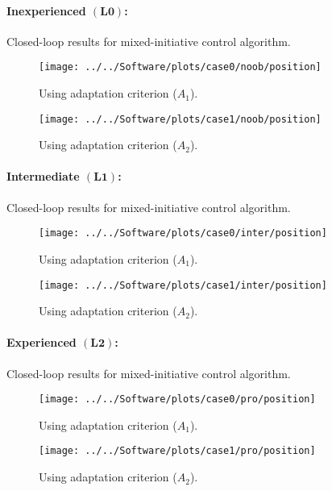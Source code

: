 \newpage
\paragraph{Inexperienced $(\mathbf{L0})$:} Closed-loop results for mixed-initiative control algorithm.
\begin{figure*}[h]\centering
	\texttt{[image: ../../Software/plots/case0/noob/position]}
	\caption{Using adaptation criterion ($A_1$).}\label{fig:l0_a1}%
	\vspace{0.5cm}
	\texttt{[image: ../../Software/plots/case1/noob/position]}
	\caption{Using adaptation criterion ($A_2$).}\label{fig:l0_a2}%
\end{figure*}
\newpage
\paragraph{Intermediate $(\mathbf{L1})$:} Closed-loop results for mixed-initiative control algorithm.
\begin{figure*}[h]\centering
	\texttt{[image: ../../Software/plots/case0/inter/position]}
	\caption{Using adaptation criterion ($A_1$).}\label{fig:l1_a1}%
	\vspace{0.5cm}
	\texttt{[image: ../../Software/plots/case1/inter/position]}
	\caption{Using adaptation criterion ($A_2$).}\label{fig:l1_a2}%
\end{figure*}
\newpage
\paragraph{Experienced $(\mathbf{L2})$:} Closed-loop results for mixed-initiative control algorithm.
\begin{figure*}[h]\centering
	\texttt{[image: ../../Software/plots/case0/pro/position]}
	\caption{Using adaptation criterion ($A_1$).}\label{fig:l2_a1}%
	\vspace{0.5cm}
	\texttt{[image: ../../Software/plots/case1/pro/position]}
	\caption{Using adaptation criterion ($A_2$).}\label{fig:l2_a2}%
\end{figure*}
